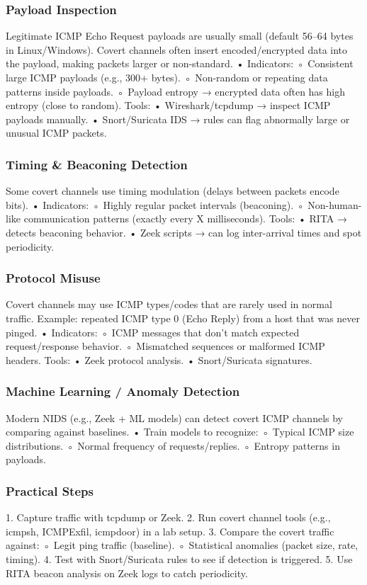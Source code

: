 \subsubsection{Payload Inspection}
Legitimate ICMP Echo Request payloads are usually small (default 56–64 bytes in Linux/Windows). 
Covert channels often insert encoded/encrypted data into the payload, making packets larger or non-standard. 
    • Indicators:
    ◦ Consistent large ICMP payloads (e.g., 300+ bytes).
    ◦ Non-random or repeating data patterns inside payloads.
    ◦ Payload entropy → encrypted data often has high entropy (close to random).
Tools:
    • Wireshark/tcpdump → inspect ICMP payloads manually.
    • Snort/Suricata IDS → rules can flag abnormally large or unusual ICMP packets.


\subsubsection{Timing \& Beaconing Detection}
Some covert channels use timing modulation (delays between packets encode bits).
• Indicators:
    ◦ Highly regular packet intervals (beaconing).
    ◦ Non-human-like communication patterns (exactly every X milliseconds).
Tools:
    • RITA → detects beaconing behavior.
    • Zeek scripts → can log inter-arrival times and spot periodicity.


\subsubsection{Protocol Misuse} 
Covert channels may use ICMP types/codes that are rarely used in normal traffic.
Example: repeated ICMP type 0 (Echo Reply) from a host that was never pinged.
• Indicators:
    ◦ ICMP messages that don’t match expected request/response behavior.
    ◦ Mismatched sequences or malformed ICMP headers.
Tools:
    • Zeek protocol analysis.
    • Snort/Suricata signatures.

\subsubsection{Machine Learning / Anomaly Detection}
Modern NIDS (e.g., Zeek + ML models) can detect covert ICMP channels by comparing against baselines. 
• Train models to recognize:
    ◦ Typical ICMP size distributions.
    ◦ Normal frequency of requests/replies.
    ◦ Entropy patterns in payloads.

\subsubsection{Practical Steps}
    1. Capture traffic with tcpdump or Zeek.
    2. Run covert channel tools (e.g., icmpsh, ICMPExfil, icmpdoor) in a lab setup.
    3. Compare the covert traffic against:
        ◦ Legit ping traffic (baseline).
        ◦ Statistical anomalies (packet size, rate, timing).
    4. Test with Snort/Suricata rules to see if detection is triggered.
    5. Use RITA beacon analysis on Zeek logs to catch periodicity. 

